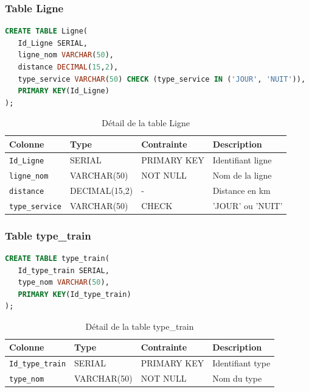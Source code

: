 \documentclass[12pt,a4paper]{article}
\begin{document}
\subsubsection{Table Ligne}
\begin{lstlisting}[language=SQL, caption=Structure de la table Ligne]
CREATE TABLE Ligne(
   Id_Ligne SERIAL,
   ligne_nom VARCHAR(50),
   distance DECIMAL(15,2),
   type_service VARCHAR(50) CHECK (type_service IN ('JOUR', 'NUIT')),
   PRIMARY KEY(Id_Ligne)
);
\end{lstlisting}

\begin{table}[h!]
\centering
\begin{tabular}{|p{3.5cm}|p{2.5cm}|p{2.5cm}|p{4cm}|}
\hline
\textbf{Colonne} & \textbf{Type} & \textbf{Contrainte} & \textbf{Description} \\
\hline
\texttt{Id\_Ligne} & SERIAL & PRIMARY KEY & Identifiant ligne \\
\hline
\texttt{ligne\_nom} & VARCHAR(50) & NOT NULL & Nom de la ligne \\
\hline
\texttt{distance} & DECIMAL(15,2) & - & Distance en km \\
\hline
\texttt{type\_service} & VARCHAR(50) & CHECK & 'JOUR' ou 'NUIT' \\
\hline
\end{tabular}
\caption{Détail de la table Ligne}
\end{table}

\subsubsection{Table type\_train}
\begin{lstlisting}[language=SQL, caption=Structure de la table type\_train]
CREATE TABLE type_train(
   Id_type_train SERIAL,
   type_nom VARCHAR(50),
   PRIMARY KEY(Id_type_train)
);
\end{lstlisting}

\begin{table}[h!]
\centering
\begin{tabular}{|p{3.5cm}|p{2.5cm}|p{2.5cm}|p{4cm}|}
\hline
\textbf{Colonne} & \textbf{Type} & \textbf{Contrainte} & \textbf{Description} \\
\hline
\texttt{Id\_type\_train} & SERIAL & PRIMARY KEY & Identifiant type \\
\hline
\texttt{type\_nom} & VARCHAR(50) & NOT NULL & Nom du type \\
\hline
\end{tabular}
\caption{Détail de la table type\_train}
\end{table}
\end{document}
